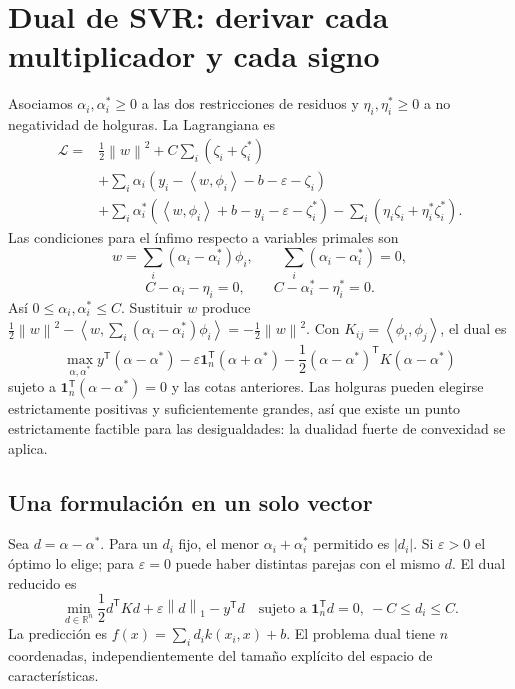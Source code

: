 \documentclass[11pt,a4paper]{article}
\newcommand{\R}{\mathbb R}
\newcommand{\T}{^{\mathsf T}}
\newcommand{\norm}[1]{\left\lVert #1\right\rVert}
\newcommand{\ip}[2]{\left\langle #1,#2\right\rangle}
\newcommand{\ones}{\mathbf 1}
\theoremstyle{definition}
\begin{document}
\section{Dual de SVR: derivar cada multiplicador y cada signo}
Asociamos $\alpha_i,\alpha_i^*\ge0$ a las dos restricciones de residuos y $\eta_i,\eta_i^*\ge0$ a no negatividad de holguras. La Lagrangiana es
\begin{align*}
\mathcal L={}&\frac12\norm w^2+C\sum_i(\zeta_i+\zeta_i^*)\\
&+\sum_i\alpha_i(y_i-\ip w{\phi_i}-b-\varepsilon-\zeta_i)\\
&+\sum_i\alpha_i^*(\ip w{\phi_i}+b-y_i-\varepsilon-\zeta_i^*)
-\sum_i(\eta_i\zeta_i+\eta_i^*\zeta_i^*).
\end{align*}
Las condiciones para el ínfimo respecto a variables primales son
\[
w=\sum_i(\alpha_i-\alpha_i^*)\phi_i,\qquad
\sum_i(\alpha_i-\alpha_i^*)=0,
\]
\[
C-\alpha_i-\eta_i=0,\qquad C-\alpha_i^*-\eta_i^*=0.
\]
Así $0\le\alpha_i,\alpha_i^*\le C$. Sustituir $w$ produce $\tfrac12\norm w^2-\ip w{\sum_i(\alpha_i-\alpha_i^*)\phi_i}=-\tfrac12\norm w^2$. Con $K_{ij}=\ip{\phi_i}{\phi_j}$, el dual es
\[
\boxed{\max_{\alpha,\alpha^*}
y\T(\alpha-\alpha^*)-\varepsilon\ones_n\T(\alpha+\alpha^*)
-\frac12(\alpha-\alpha^*)\T K(\alpha-\alpha^*)}
\]
sujeto a $\ones_n\T(\alpha-\alpha^*)=0$ y las cotas anteriores. Las holguras pueden elegirse estrictamente positivas y suficientemente grandes, así que existe un punto estrictamente factible para las desigualdades: la dualidad fuerte de convexidad se aplica.
\subsection{Una formulación en un solo vector}
Sea $d=\alpha-\alpha^*$. Para un $d_i$ fijo, el menor $\alpha_i+\alpha_i^*$ permitido es $|d_i|$. Si $\varepsilon>0$ el óptimo lo elige; para $\varepsilon=0$ puede haber distintas parejas con el mismo $d$. El dual reducido es
\[
\boxed{\min_{d\in\R^n}\frac12d\T Kd+\varepsilon\norm d_1-y\T d
\quad\text{sujeto a }\ones_n\T d=0,\ -C\le d_i\le C}.
\]
La predicción es $f(x)=\sum_i d_i k(x_i,x)+b$. El problema dual tiene $n$ coordenadas, independientemente del tamaño explícito del espacio de características.
\end{document}
